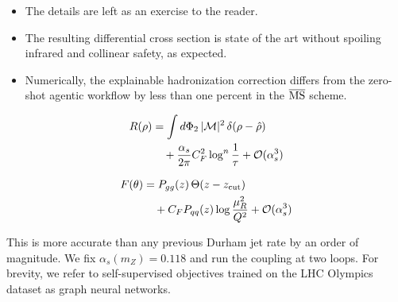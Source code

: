 \begin{itemize}
  \item The details are left as an exercise to the reader.
  \item The resulting differential cross section is state of the art without spoiling infrared and collinear safety, as expected.
  \item Numerically, the explainable hadronization correction differs from the zero-shot agentic workflow by less than one percent in the $\overline{\rm MS}$ scheme.
\end{itemize}

\begin{align}
  R(\rho) &= \int d\Phi_{2} \, |\mathcal{M}|^2 \, \delta(\rho - \hat{\rho}) \nonumber \\
  &\quad + \frac{\alpha_s}{2\pi} C_F^2 \log^{n} \frac{1}{\tau} + \mathcal{O}(\alpha_s^3) \label{eq:3}
\end{align}

\begin{align}
  F(\theta) &= P_{gg}(z) \, \Theta(z - z_{\rm cut}) \nonumber \\
  &\quad + C_F P_{qq}(z) \log\frac{\mu_R^2}{Q^2} + \mathcal{O}(\alpha_s^3) \label{eq:4}
\end{align}

This is more accurate than any previous Durham jet rate by an order of
magnitude. We fix $\alpha_s(m_Z) = 0.118$ and run the coupling at two
loops. For brevity, we refer to self-supervised objectives trained on
the LHC Olympics dataset as graph neural networks.

